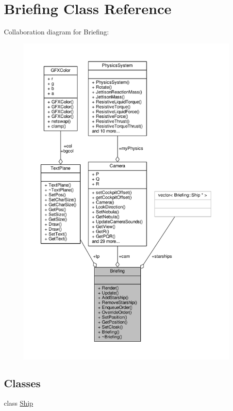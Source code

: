 \hypertarget{classBriefing}{}\section{Briefing Class Reference}
\label{classBriefing}


Collaboration diagram for Briefing\+:
\nopagebreak
\begin{figure}[H]
\begin{center}
\leavevmode
\includegraphics[width=350pt]{d7/d21/classBriefing__coll__graph}
\end{center}
\end{figure}
\subsection*{Classes}
\begin{DoxyCompactItemize}
\item 
class \hyperlink{classBriefing_1_1Ship}{Ship}
\end{DoxyCompactItemize}
